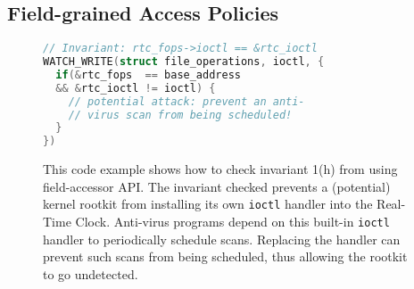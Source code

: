 \documentclass[letterpaper,twocolumn,10pt]{article}
\let\ORIGcaption\caption
\renewcommand{\caption}[2][\compressedcaption]{%
\def\compressedcaption{#2}%
    \vspace{-12pt}%
    \ORIGcaption[#1]{#2}%
    \vspace{-12pt}}
\begin{document}







\subsection{Field-grained Access Policies\label{sec:access_policies}}

\begin{figure}[t]
\begin{lstlisting}[language=C,basicstyle=\footnotesize\ttfamily]
// Invariant: rtc_fops->ioctl == &rtc_ioctl
WATCH_WRITE(struct file_operations, ioctl, {
  if(&rtc_fops  == base_address
  && &rtc_ioctl != ioctl) {
    // potential attack: prevent an anti-
    // virus scan from being scheduled!
  }
})
\end{lstlisting}
\caption{\label{fig:field_invariant_check}This code example shows how to check invariant 1(h) from \cite{GibraltarKernelInvariants} using field-accessor API. The invariant checked prevents a (potential) kernel rootkit from installing its own \texttt{ioctl} handler into the Real-Time Clock. Anti-virus programs depend on this built-in \texttt{ioctl} handler to periodically schedule scans. Replacing the handler can prevent such scans from being scheduled, thus allowing the rootkit to go undetected.}
\end{figure}
\end{document}

